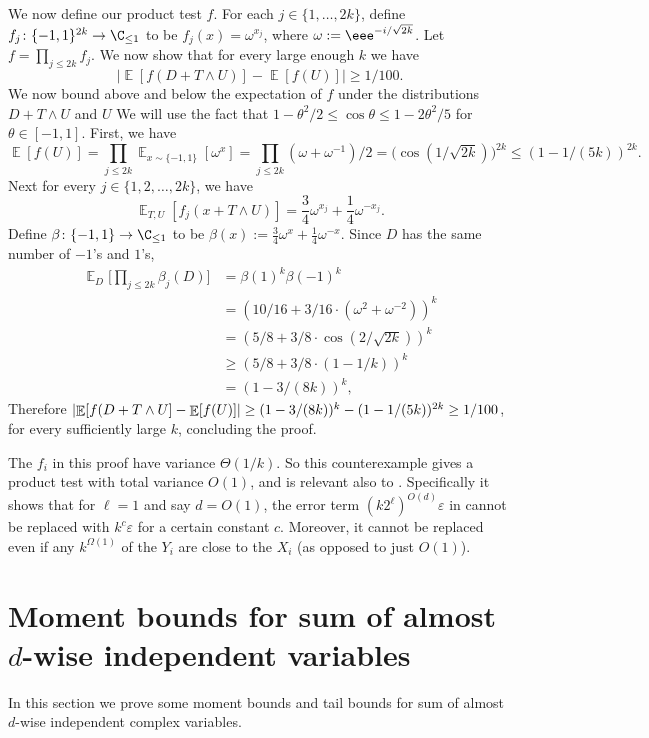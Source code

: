 \documentclass{toc}
\def\eps{\varepsilon}
\def\pmone{\{-1, 1\}}
\def\Blocklength{\ell}
\DeclarePairedDelimiter{\abs}{\lvert}{\rvert}
\DeclareMathOperator*{\E}{\mathbb{E}}                 %
\begin{document}
    We now define our product test $f$.
    For each $j \in \{1, \ldots, 2k\}$, define $f_j\colon \pmone^{2k} \to \C_{\le 1}$ to be $f_j(x) = \omega^{x_j}$, where $\omega := \eee^{-i/\sqrt{2k}}$.
    Let $f = \prod_{j \le 2k} f_j$.
    We now show that for every large enough $k$ we have
    \[
      \Big| \E[f(D + T \wedge U)] - \E[f(U)] \Big| \ge 1/100 .
    \]
    We now bound above and below the expectation of $f$ under the distributions $D + T\wedge U$ and $U$
    We will use the fact that $1 - \theta^2/2  \le \cos \theta \le 1 - 2 \theta^2 / 5$ for $\theta \in [-1,1]$.
    First, we have
    \[
      \E[f(U)]
      = \prod_{j \le 2k} \E_{x \sim \pmone} [\omega^{x}]
      = \prod_{j \le 2k} (\omega + \omega^{-1}) / 2
      = \Big( \cos(1 / \sqrt{2k}) \Big)^{2k}
      \le (1 - 1/(5k))^{2k} .
    \]
    Next for every $j \in \{1, 2, \ldots, 2k\}$, we have
    \[
      \E_{T,U} [f_j(x + T \wedge U)]
      = \frac{3}{4} \omega^{x_j} + \frac{1}{4} \omega^{-x_j} .
    \]
    Define $\beta \colon \pmone \to \C_{\le 1}$ to be $\beta(x) := \frac{3}{4} \omega^{x} + \frac{1}{4} \omega^{-x}$.
    Since $D$ has the same number of $-1$'s and $1$'s,
    \begin{align*}
      \E_D \Big[ \prod_{j \le 2k} \beta_j(D) \Big]
      &= \beta(1)^k \beta(-1)^k \\
      &= (10/16 + 3/16 \cdot (\omega^2 + \omega^{-2}))^k \\
      &= (5/8 + 3/8 \cdot \cos(2/\sqrt{2k}))^k \\
      &\ge (5/8 + 3/8 \cdot (1 - 1/k))^k \\
      &= (1 - 3/(8k))^k ,
    \end{align*}
    Therefore $\abs{\E[f(D + T \wedge U] - \E[f(U)]} \ge (1 - 3/(8k))^{k} - (1 - 1/(5k))^{2k} \ge 1/100$, for every sufficiently large
    $k$, concluding the proof.

  The $f_i$ in this proof have variance $\Theta(1/k)$.
  So this counterexample gives a product test with total variance $O(1)$, and is relevant also to .
  Specifically it shows that for $\Blocklength = 1$ and say $d = O(1)$, the error term $(k 2^\Blocklength)^{O(d)} \eps$ in  cannot be replaced with $k^c \eps$ for a certain constant $c$.
  Moreover, it cannot be replaced even if any $k^{\Omega(1)}$ of the $Y_i$ are close to the $X_i$ (as opposed to just $O(1)$).

\section{Moment bounds for sum of almost \texorpdfstring{$d$}{d}-wise independent variables} \label{sec:moment-bounds}
  In this section we prove some moment bounds and tail bounds for sum of almost $d$-wise independent complex variables.
\end{document}
